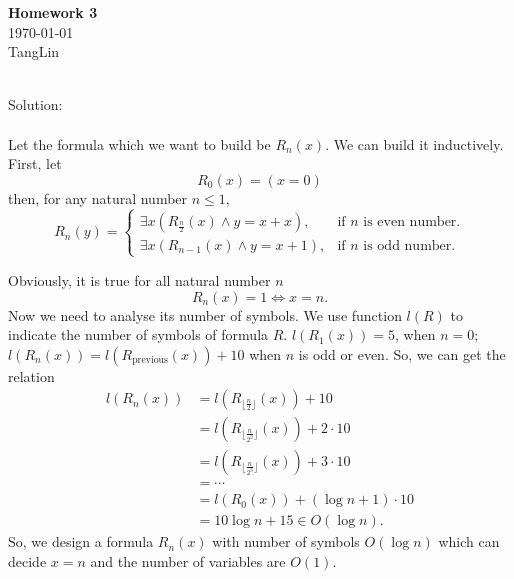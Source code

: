 \documentclass[a4papper]{article}
\theoremstyle{neosn}
\begin{document}
    \begin{center}
    {\bf Homework 3} \\
        \today \\
        TangLin
    \end{center}

    \\

    Solution: \\

    \\
    Let the formula which we want to build be $R_n(x)$.
    We can build it inductively.
    First, let
    \[
        R_0(x) = (x=0)
    \]
    then, for any natural number $n \leqslant 1$,
    \[
        R_n(y) = \begin{cases}
                     \exists x \left(R_{\frac{n}{2}}(x) \land y=x+x\right), & \text{if } n \text{ is even number.} \\
                     \exists x \left(R_{n-1}(x) \land y=x+1\right), & \text{if } n \text{ is odd number.}
                 \end{cases}
    \]

    Obviously, it is true for all natural number $n$
    \[
        R_n(x) = 1 \Leftrightarrow x=n.
    \]
    Now we need to analyse its number of symbols.
    We use function $l(R)$ to indicate the number of symbols of formula $R$.
    $l(R_1(x)) = 5$, when $n=0$; $l(R_n(x)) = l(R_{\text{previous}}(x)) + 10$ when $n$ is odd or even.
    So, we can get the relation
    \[
        \begin{array}{ll}
            l(R_n(x)) &= l(R_{\lfloor \frac{n}{2} \rfloor}(x)) + 10 \\
                        &= l(R_{\lfloor \frac{n}{2^2} \rfloor}(x)) + 2 \cdot 10 \\
                        & = l(R_{\lfloor \frac{n}{2^3} \rfloor}(x)) + 3 \cdot 10 \\
                        & = \cdots \\
                        & = l(R_0(x)) + (\log n + 1)\cdot 10 \\
                        & = 10 \log n + 15 \in O(\log n).
        \end{array}
    \]
    So, we design a formula $R_n(x)$ with number of symbols $O(\log n)$ which can decide $x = n$ and
    the number of variables are $O(1)$.
    \\
\end{document}

